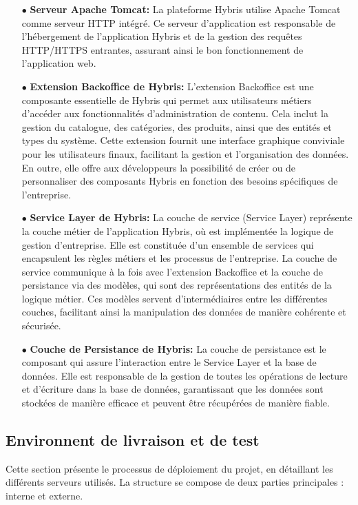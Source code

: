 \begin{itemize}
    \item [$\bullet$]\textbf{Serveur Apache Tomcat:} La plateforme Hybris utilise Apache Tomcat comme serveur HTTP intégré. Ce serveur d'application est responsable de l'hébergement de l'application Hybris et de la gestion des requêtes HTTP/HTTPS entrantes, assurant ainsi le bon fonctionnement de l'application web.
    \item [$\bullet$]\textbf{Extension Backoffice de Hybris:} L'extension Backoffice est une composante essentielle de Hybris qui permet aux utilisateurs métiers d'accéder aux fonctionnalités d'administration de contenu. Cela inclut la gestion du catalogue, des catégories, des produits, ainsi que des entités et types du système. Cette extension fournit une interface graphique conviviale pour les utilisateurs finaux, facilitant la gestion et l'organisation des données. En outre, elle offre aux développeurs la possibilité de créer ou de personnaliser des composants Hybris en fonction des besoins spécifiques de l'entreprise.
    \item [$\bullet$]\textbf{Service Layer de Hybris: }La couche de service (Service Layer) représente la couche métier de l'application Hybris, où est implémentée la logique de gestion d'entreprise. Elle est constituée d'un ensemble de services qui encapsulent les règles métiers et les processus de l'entreprise. La couche de service communique à la fois avec l'extension Backoffice et la couche de persistance via des modèles, qui sont des représentations des entités de la logique métier. Ces modèles servent d'intermédiaires entre les différentes couches, facilitant ainsi la manipulation des données de manière cohérente et sécurisée.
    \item [$\bullet$]\textbf{Couche de Persistance de Hybris:} La couche de persistance est le composant qui assure l'interaction entre le Service Layer et la base de données. Elle est responsable de la gestion de toutes les opérations de lecture et d'écriture dans la base de données, garantissant que les données sont stockées de manière efficace et peuvent être récupérées de manière fiable. 
\end{itemize}

\subsection{Environnent de livraison et de test }


Cette section présente le processus de déploiement du projet, en détaillant les différents serveurs utilisés. La structure se compose de deux parties principales : interne et externe.

